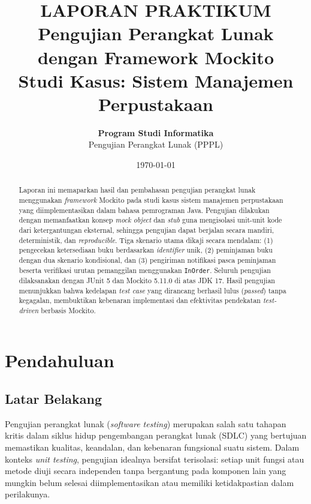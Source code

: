 \documentclass[12pt,a4paper]{article}
\title{
    \vspace{-1cm}
    {\Large \textbf{LAPORAN PRAKTIKUM}} \\[0.5em]
    {\large \textbf{Pengujian Perangkat Lunak dengan Framework Mockito}} \\[0.3em]
    {\normalsize Studi Kasus: Sistem Manajemen Perpustakaan}
}
\author{
    \textbf{Program Studi Informatika} \\
    Pengujian Perangkat Lunak (PPPL)
}
\date{\today}
\begin{document}

\maketitle
\thispagestyle{fancy}

\begin{abstract}
\noindent
Laporan ini memaparkan hasil dan pembahasan pengujian perangkat lunak menggunakan
\textit{framework} Mockito pada studi kasus sistem manajemen perpustakaan yang
diimplementasikan dalam bahasa pemrograman Java. Pengujian dilakukan dengan
memanfaatkan konsep \textit{mock object} dan \textit{stub} guna mengisolasi
unit-unit kode dari ketergantungan eksternal, sehingga pengujian dapat berjalan
secara mandiri, deterministik, dan \textit{reproducible}. Tiga skenario utama
dikaji secara mendalam: (1) pengecekan ketersediaan buku berdasarkan
\textit{identifier} unik, (2) peminjaman buku dengan dua skenario kondisional,
dan (3) pengiriman notifikasi pasca peminjaman beserta verifikasi urutan
pemanggilan menggunakan \texttt{InOrder}. Seluruh pengujian dilaksanakan dengan
JUnit 5 dan Mockito 5.11.0 di atas JDK 17. Hasil pengujian menunjukkan bahwa
kedelapan \textit{test case} yang dirancang berhasil lulus (\textit{passed})
tanpa kegagalan, membuktikan kebenaran implementasi dan efektivitas pendekatan
\textit{test-driven} berbasis Mockito.
\end{abstract}

\tableofcontents
\newpage

\section{Pendahuluan}

\subsection{Latar Belakang}

Pengujian perangkat lunak (\textit{software testing}) merupakan salah satu
tahapan kritis dalam siklus hidup pengembangan perangkat lunak (SDLC) yang
bertujuan memastikan kualitas, keandalan, dan kebenaran fungsional suatu sistem.
Dalam konteks \textit{unit testing}, pengujian idealnya bersifat terisolasi:
setiap unit fungsi atau metode diuji secara independen tanpa bergantung pada
komponen lain yang mungkin belum selesai diimplementasikan atau memiliki
ketidakpastian dalam perilakunya.
\end{document}
